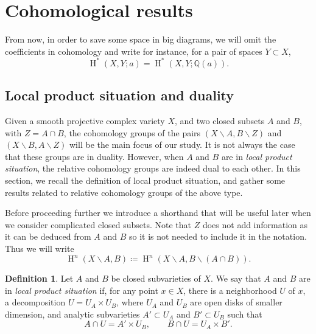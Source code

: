 \documentclass[11pt,a4paper]{amsart}
\newcommand{\Q}{\mathds{Q}}
\DeclareMathOperator{\rH}{H}
\numberwithin{equation}{section}
\theoremstyle{plain}
\theoremstyle{definition}
\newtheorem{df}[prop]{Definition}
\begin{document}
\section{Cohomological results}
\label{sec:cohom-results}
From now, in order to save some space in big diagrams, we will omit
the coefficients in cohomology and write for instance, for a pair of spaces
$Y\subset X$, 
\begin{displaymath}
  \rH^{\ast}(X,Y;a)=\rH^{\ast}(X,Y;\Q(a)).
\end{displaymath}
\subsection{Local product situation and duality}
\label{sec:local-prod-situ}
Given a smooth projective complex variety $X$, and two closed subsets $A$ and
$B$, with $Z=A\cap B$, the
cohomology groups of the pairs $(X\smallsetminus A, B\smallsetminus Z)$ and
$(X\smallsetminus B, A\smallsetminus Z)$ will 
be the main focus of our study. It is not always the case that these
groups  
are in duality. However, when $A$ and $B$ are in \textit{local
  product situation}, the relative cohomology groups are indeed dual
to each other. In this section, we recall the definition of local
product situation, and gather some results related to relative cohomology
groups of the above type.

Before proceeding further we introduce a shorthand that will be useful
later when we consider complicated closed subsets. 
Note that $Z$ does not add  information as it can be deduced from $A$
and $B$ so it is not needed to include it in the notation. Thus we
will write
\begin{displaymath}
  \rH^{n}(X\smallsetminus A,B) \coloneqq
  \rH^{n}(X\smallsetminus A,B\smallsetminus (A\cap B)).
\end{displaymath}

\begin{df}\label{def:sec-1-product}
  Let $A$ and $B$ be closed subvarieties of $X$. We say that $A$ and
  $B$ are in \emph{local product situation} if, for any point $x\in X$,
  there is a
  neighborhood $U$ of $x$, a decomposition $U=U_{A}\times U_{B}$,
  where $U_{A}$ and $U_{B}$ are open disks of smaller dimension, and
  analytic subvarieties $A'\subset U_{A}$ and $B'\subset U_{B}$ such
  that
  \begin{displaymath}
    A\cap U = A'\times U_{B},\qquad B\cap U = U_{A}\times B'.
  \end{displaymath}
\end{df}
\end{document}
